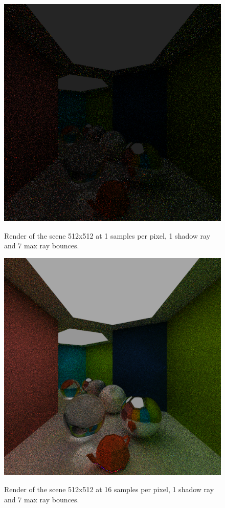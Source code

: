 \documentclass[a4paper, twocolumn]{article}
\begin{document}
            \begin{figure}[H]
                \centering
                \caption{Render of the scene 512x512 at 1 samples per pixel, 1 shadow ray and 7 max ray bounces.}
                \includegraphics[width=0.8\linewidth]{share/results/supersamples_1.png}
                \label{fig:supersamples_1}
            \end{figure}

            \begin{figure}[H]
                \centering
                \caption{Render of the scene 512x512 at 16 samples per pixel, 1 shadow ray and 7 max ray bounces.}
                \includegraphics[width=0.8\linewidth]{share/results/supersamples_16.png}
                \label{fig:supersamples_16}
            \end{figure}
\end{document}
